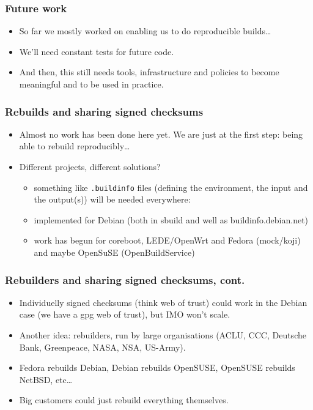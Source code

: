 \documentclass[14pt]{beamer}
\begin{document}
\begin{frame}
 \frametitle{Future work}
 \begin{itemize}
 \item<1-3> So far we mostly worked on enabling us to do reproducible builds…
 \item<2-3> We'll need constant tests for future code.
 \item<3> And then, this still needs tools, infrastructure and policies to become
 meaningful and to be used in practice.
 \end{itemize}
\end{frame}

\begin{frame}
 \frametitle{Rebuilds and sharing signed checksums}
 \begin{itemize}
  \item Almost no work has been done here yet. We are just at the first step:
  being able to rebuild reproducibly…
  \item Different projects, different solutions?
 \begin{itemize}
  \item<2> something like \texttt{.buildinfo} files (defining the environment,
  the input and the output(s)) will be needed everywhere:
  \item<2> implemented for Debian (both in sbuild and well as
  buildinfo.debian.net)
  \item<2> work has begun for coreboot, LEDE/OpenWrt and Fedora (mock/koji)
  and maybe OpenSuSE (OpenBuildService)
 \end{itemize}
 \end{itemize}
\end{frame}

\begin{frame}
 \frametitle{Rebuilders and sharing signed checksums, cont.}
 \begin{itemize}
  \item Individuelly signed checksums (think web of trust) could work in the
  Debian case (we have a gpg web of trust), but IMO won't scale.
  \item { Another idea: rebuilders, run by large organisations
  (ACLU, CCC, Deutsche Bank, Greenpeace, NASA, NSA, US-Army).}
  \item Fedora rebuilds Debian, Debian rebuilds OpenSUSE, OpenSUSE rebuilds
  NetBSD, etc…
  \item Big customers could just rebuild everything themselves.
 \end{itemize}
\end{frame}
\end{document}
